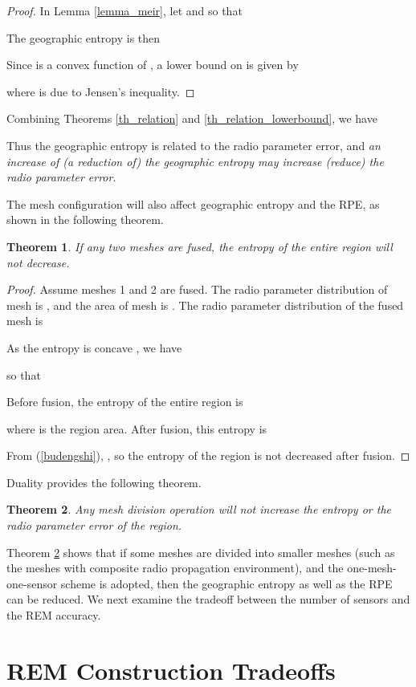 \documentclass[conference]{IEEEtran}
\newtheorem{Theo}{Theorem}
\begin{document}
\begin{proof}
In Lemma \ref{lemma_meir}, let  and  so that

The geographic entropy is then

Since  is a convex function of , a lower bound on  is given by

where  is due to Jensen's inequality.
\end{proof}
Combining Theorems \ref{th_relation} and \ref{th_relation_lowerbound}, we have

Thus the geographic entropy is related to the radio parameter error,
and \emph{an increase of (a reduction of) the geographic entropy may increase (reduce) the radio parameter error}.

The mesh configuration will also affect geographic entropy and the RPE, as shown in the following theorem.
\begin{Theo}
If any two meshes are fused, the entropy of the entire region will not decrease.
\end{Theo}

\begin{proof}
Assume meshes 1 and 2 are fused.
The radio parameter distribution of mesh  is , and the area of mesh  is .
The radio parameter distribution of the fused mesh is

As the entropy is concave \cite{Cover}, we have

so that

Before fusion, the entropy of the entire region is

where  is the region area.
After fusion, this entropy is

From (\ref{budengshi}), , so the entropy of the region is not decreased after fusion.
\end{proof}

Duality provides the following theorem.
\begin{Theo}\label{th_mesh_division_reduce_entropy}
Any mesh division operation will not increase the entropy or the radio parameter error of the region.
\end{Theo}

Theorem \ref{th_mesh_division_reduce_entropy} shows that if some meshes are divided into smaller meshes
(such as the meshes with composite radio propagation environment), and
the one-mesh-one-sensor scheme is adopted, then the geographic entropy as well as the RPE can be reduced.
We next examine the tradeoff between the number of sensors and the REM accuracy.

\section{REM Construction Tradeoffs}
\end{document}
